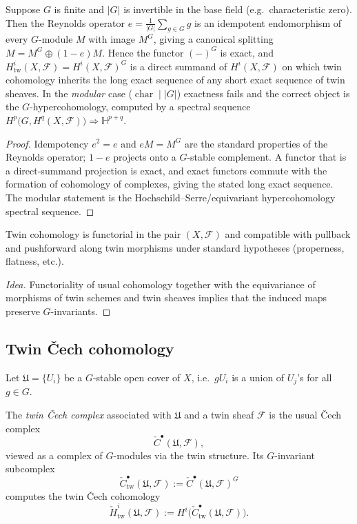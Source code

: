 \documentclass[11pt,a4paper]{article}
\numberwithin{equation}{section}
\newcommand{\Fcal}{\mathcal{F}}
\newcommand{\abs}[1]{\left\lvert #1 \right\rvert}
\begin{document}
	\begin{lemma}\label{lem:averaging}
		Suppose $G$ is finite and $\abs{G}$ is invertible in the base field (e.g.\ characteristic zero). Then the
		Reynolds operator $e=\tfrac1{\abs G}\sum_{g\in G}g$ is an idempotent endomorphism of every $G$-module $M$
		with image $M^G$, giving a canonical splitting $M=M^G\oplus(1-e)M$. Hence the functor $(-)^G$ is exact, and
		$H^i_{\mathrm{tw}}(X,\Fcal)=H^i(X,\Fcal)^G$ is a direct summand of $H^i(X,\Fcal)$ on which twin cohomology
		inherits the long exact sequence of any short exact sequence of twin sheaves. In the \emph{modular} case
		($\operatorname{char}\mid\abs G$) exactness fails and the correct object is the $G$-hypercohomology,
		computed by a spectral sequence $H^p\!\big(G,H^q(X,\Fcal)\big)\Rightarrow \mathbb H^{p+q}$.
	\end{lemma}

	\begin{proof}
		Idempotency $e^2=e$ and $eM=M^G$ are the standard properties of the Reynolds operator; $1-e$ projects onto a
		$G$-stable complement. A functor that is a direct-summand projection is exact, and exact functors commute
		with the formation of cohomology of complexes, giving the stated long exact sequence. The modular statement
		is the Hochschild--Serre/equivariant hypercohomology spectral sequence.
	\end{proof}

	\begin{proposition}[Functoriality]
		Twin cohomology is functorial in the pair $(X,\Fcal)$ and compatible with pullback and pushforward
		along twin morphisms under standard hypotheses (properness, flatness, etc.).
	\end{proposition}
	
	\begin{proof}[Idea]
		Functoriality of usual cohomology together with the equivariance of morphisms of twin schemes and twin sheaves
		implies that the induced maps preserve $G$-invariants.
	\end{proof}
	
	\subsection{Twin \v{C}ech cohomology}
	
	Let $\mathfrak{U}=\{U_i\}$ be a $G$-stable open cover of $X$, i.e.\ $gU_i$ is a union of $U_j$'s for all $g\in G$.
	
	\begin{definition}
		The \emph{twin \v{C}ech complex} associated with $\mathfrak{U}$ and a twin sheaf $\Fcal$ is the usual
		\v{C}ech complex
		\[
		\check{C}^\bullet(\mathfrak{U},\Fcal),
		\]
		viewed as a complex of $G$-modules via the twin structure. Its $G$-invariant subcomplex
		\[
		\check{C}^\bullet_{\mathrm{tw}}(\mathfrak{U},\Fcal) := \check{C}^\bullet(\mathfrak{U},\Fcal)^G
		\]
		computes the twin \v{C}ech cohomology
		\[
		\check{H}^i_{\mathrm{tw}}(\mathfrak{U},\Fcal) := H^i\big(\check{C}^\bullet_{\mathrm{tw}}(\mathfrak{U},\Fcal)\big).
		\]
	\end{definition}
	
\end{document}
